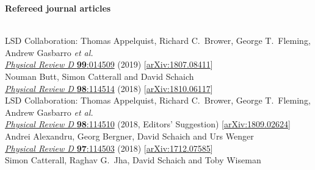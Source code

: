 \begin{spacelist}
  \item {\large \bfseries Refereed journal articles}
  \begin{revnumerate}
    \setlength{\topsep}{-8 pt}
    \setlength{\itemsep}{10 pt}
    \setlength{\leftmargin}{0 mm}
    \pagebreakitem
       \\
      LSD Collaboration: Thomas Appelquist, Richard C.~Brower, George T.~Fleming, Andrew Gasbarro \textit{et al.} \\ %
      \href{http://dx.doi.org/10.1103/PhysRevD.99.014509}{\textit{Physical Review D} \textbf{99}:014509} (2019) [\href{http://arxiv.org/abs/1807.08411}{arXiv:1807.08411}]
    \pagebreakitem
       \\
      Nouman Butt, Simon Catterall and David Schaich \\
      \href{http://dx.doi.org/10.1103/PhysRevD.98.114514}{\textit{Physical Review D} \textbf{98}:114514} (2018) [\href{http://arxiv.org/abs/1810.06117}{arXiv:1810.06117}]
    \pagebreakitem
       \\
      LSD Collaboration: Thomas Appelquist, Richard C.~Brower, George T.~Fleming, Andrew Gasbarro \textit{et al.} \\ %
      \href{http://dx.doi.org/10.1103/PhysRevD.98.114510}{\textit{Physical Review D} \textbf{98}:114510} (2018, Editors' Suggestion) [\href{http://arxiv.org/abs/1809.02624}{arXiv:1809.02624}]
    \pagebreakitem
       \\
      Andrei Alexandru, Georg Bergner, David Schaich and Urs Wenger \\
      \href{http://dx.doi.org/10.1103/PhysRevD.97.114503}{\textit{Physical Review D} \textbf{97}:114503} (2018) [\href{http://arxiv.org/abs/1712.07585}{arXiv:1712.07585}]
    \pagebreakitem
       \\
      Simon Catterall, Raghav G.~Jha, David Schaich and Toby Wiseman \\

\end{revnumerate}
\end{spacelist}
